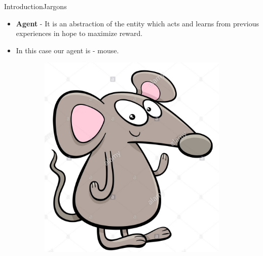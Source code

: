 \documentclass[10pt]{beamer}
\begin{document}
\begin{frame}{Introduction}{Jargons}

\begin{itemize}
\item \textbf{Agent} - It is an abstraction of the entity which acts and learns from previous experiences in hope to maximize reward.
\item In this case our agent is - mouse.
\end{itemize}

\begin{figure}[!htb]
\centering
\begin{subfigure}[t]{0.6\linewidth}
\includegraphics[width=.8\textwidth]{assets/mouse.jpg}
\end{subfigure}

\vspace{0.1in}
\label{fig:tripEmb}
\end{figure}

\end{frame}
\end{document}
